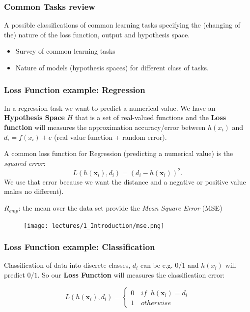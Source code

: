 \documentclass[../main.tex]{subfiles}
\begin{document}
\subsubsection*{Common Tasks review}%
A possible classifications of common learning tasks specifying the (changing of the) nature of the loss function, output and hypothesis space.
\begin{itemize}
    \item Survey of common learning tasks
    \item Nature of models (hypothesis spaces) for different class of tasks.
\end{itemize}

\subsubsection{Loss Function example: Regression}
In a regression task we want to predict a numerical value. We have an \textbf{Hypothesis Space} $H$ that is a set of real-valued functions and the \textbf{Loss function} will measures the approximation accuracy/error between $h(x_i)$ and $d_i = f(x_i) + e$ (real value function + random error).

A common loss function for Regression (predicting a numerical value) is the \emph{squared error}: 
\[
 L(h(\textbf{x}_{i}),d_{i}) = (d_{i} - h(\textbf{x}_{i}))^{2}   
.\] 
We use that error because we want the distance and a negative or positive value makes no different).
\begin{center}
    $R_{emp}$: the mean over the data set provide the \emph{Mean Square Error} (MSE)
\end{center}
\begin{figure}[ht]
    \centering
    \texttt{[image: lectures/1\_Introduction/mse.png]}
\end{figure}

\subsubsection{Loss Function example: Classification}
Classification of data into discrete classes, $d_i$ can be e.g. $0/1$ and $h(x_i)$ will predict $0/1$. So our \textbf{Loss Function} will measures the classification error:

\[
    L(h(\textbf{x}_{i}),d_{i}) = \left\{
                \begin{array}{ll}
                  0 \quad if \;\;h(\textbf{x}_{i}) = d_i\\
                  1 \quad otherwise
                \end{array}
              \right.
\]
 
\end{document}
